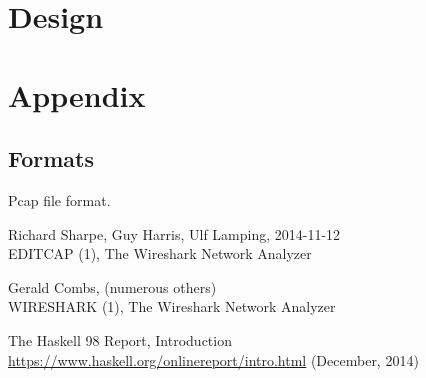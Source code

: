 \documentclass[10pt,a4paper,notitlepage]{report}
\begin{document}
\chapter{Design}


\chapter{Appendix}
\section{Formats}
Pcap file format.

\begin{thebibliography}{99}
    Richard Sharpe, Guy Harris, Ulf Lamping, 2014-11-12\\
    EDITCAP (1), The Wireshark Network Analyzer

	Gerald Combs, (numerous others)\\
	WIRESHARK (1), The Wireshark Network Analyzer

    The Haskell 98 Report, Introduction\\
    
    \url{https://www.haskell.org/onlinereport/intro.html} (December, 2014)

\end{thebibliography}
\end{document}
